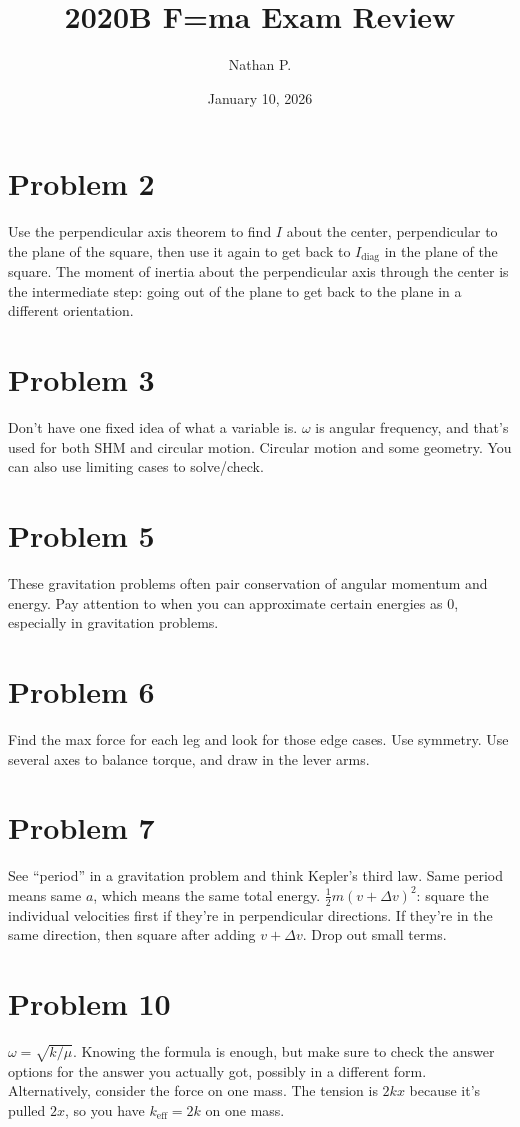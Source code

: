 \documentclass[11pt]{article}
\title{2020B F=ma Exam Review}
\author{Nathan P.}
\date{January 10, 2026}
\begin{document}
\maketitle

\section*{Problem 2}
Use the perpendicular axis theorem to find $I$ about the center, perpendicular to the plane of the square, then use it again to get back to $I_{\text{diag}}$ in the plane of the square.
The moment of inertia about the perpendicular axis through the center is the intermediate step: going out of the plane to get back to the plane in a different orientation.

\section*{Problem 3}
Don't have one fixed idea of what a variable is. $\omega$ is angular frequency, and that's used for both SHM and circular motion.
Circular motion and some geometry.
You can also use limiting cases to solve/check.

\section*{Problem 5}
These gravitation problems often pair conservation of angular momentum and energy.
Pay attention to when you can approximate certain energies as $0$, especially in gravitation problems.

\section*{Problem 6}
Find the max force for each leg and look for those edge cases.
Use symmetry.
Use several axes to balance torque, and draw in the lever arms.

\section*{Problem 7}
See ``period'' in a gravitation problem and think Kepler's third law. Same period means same $a$, which means the same total energy.
$\tfrac12m(v+\Delta v)^2$: square the individual velocities first if they're in perpendicular directions. If they're in the same direction, then square after adding $v+\Delta v$.
Drop out small terms.

\section*{Problem 10}
$\omega=\sqrt{k/\mu}$.
Knowing the formula is enough, but make sure to check the answer options for the answer you actually got, possibly in a different form.
Alternatively, consider the force on one mass. The tension is $2kx$ because it's pulled $2x$, so you have $k_{\text{eff}}=2k$ on one mass.
\end{document}
